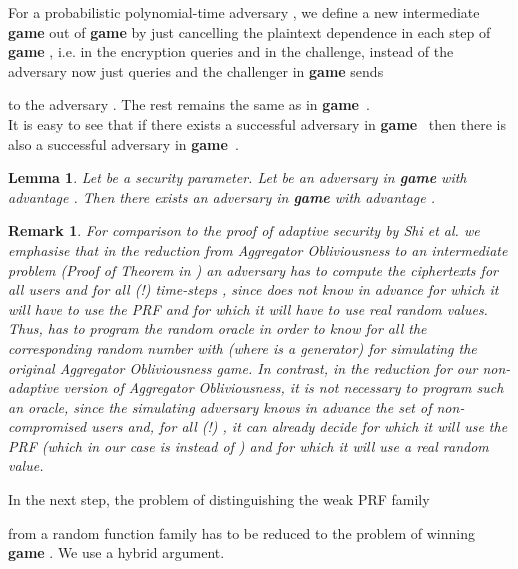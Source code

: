\documentclass[10pt]{extarticle}
\newtheorem{Lem}[Thm]{Lemma}
\newtheorem{Rem}{Remark}
\begin{document}
\noindent For a probabilistic polynomial-time adversary , we define a new intermediate \textbf{game}  out of \textbf{game}  by just cancelling the plaintext dependence in each step of \textbf{game} , i.e. in the encryption queries and in the challenge, instead of  the adversary  now just queries  and the challenger in \textbf{game}  sends

to the adversary . The rest remains the same as in \textbf{game}~.\\
It is easy to see that if there exists a successful adversary in \textbf{game}~ then there is also a successful adversary in \textbf{game}~.

\begin{Lem}\label{gametwothree} Let  be a security parameter. Let  be an adversary in \textbf{\upshape game } with advantage . Then there exists an adversary  in \textbf{\upshape game } with advantage .
\end{Lem}

\begin{Rem} For comparison to the proof of adaptive security by Shi et al.  we emphasise that in the reduction from Aggregator Obliviousness to an intermediate problem (Proof of Theorem  in ) an adversary  has to compute the ciphertexts  for all users  and for all (!) time-steps , since  does not know in advance for which  it will have to use the PRF  and for which  it will have to use real random values. Thus,  has to program the random oracle  in order to know for all  the corresponding random number  with  (where  is a generator) for simulating the original Aggregator Obliviousness game. In contrast, in the reduction for our non-adaptive version of Aggregator Obliviousness, it is not necessary to program such an oracle, since the simulating adversary  knows in advance the set of non-compromised users and, for all (!) , it can already decide for which  it will use the PRF (which in our case is  instead of ) and for which  it will use a real random value.
\end{Rem}


\noindent In the next step, the problem of distinguishing the weak PRF family 
 
from a random function family has to be reduced to the problem of winning \textbf{\upshape game }. We use a hybrid argument.
\end{document}
